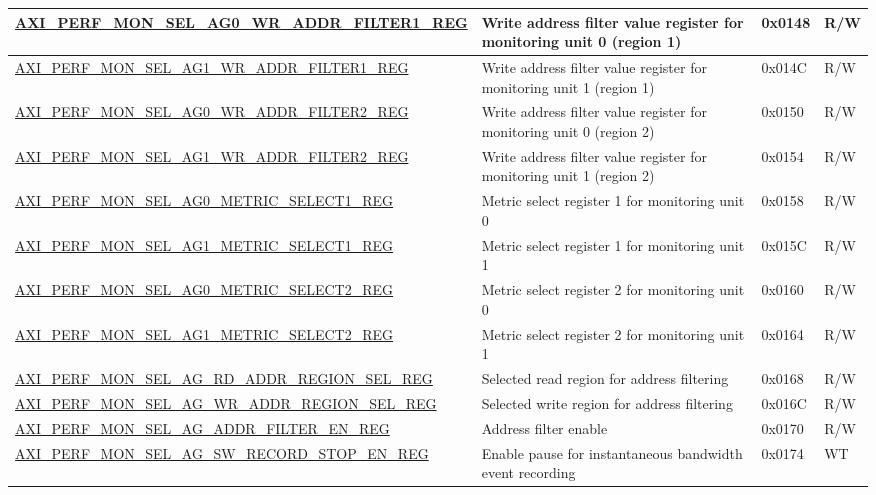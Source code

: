 \begin{longtable}{ | p{9.1cm} | p{5cm} | p{1.3cm} | p{1.4cm} | }
\hyperref[regdesc:AXIPERFMONSELAGNWRADDRFILTERMREG]{AXI\_PERF\_MON\_SEL\_AG0\_WR\_ADDR\_FILTER1\_REG} & Write address filter value register for monitoring unit 0 (region 1) & 0x0148 & R/W\\ \hline
\hyperref[regdesc:AXIPERFMONSELAGNWRADDRFILTERMREG]{AXI\_PERF\_MON\_SEL\_AG1\_WR\_ADDR\_FILTER1\_REG} & Write address filter value register for monitoring unit 1 (region 1) & 0x014C & R/W\\ \hline
\hyperref[regdesc:AXIPERFMONSELAGNWRADDRFILTERMREG]{AXI\_PERF\_MON\_SEL\_AG0\_WR\_ADDR\_FILTER2\_REG} & Write address filter value register for monitoring unit 0 (region 2) & 0x0150 & R/W\\ \hline
\hyperref[regdesc:AXIPERFMONSELAGNWRADDRFILTERMREG]{AXI\_PERF\_MON\_SEL\_AG1\_WR\_ADDR\_FILTER2\_REG} & Write address filter value register for monitoring unit 1 (region 2) & 0x0154 & R/W\\ \hline
\hyperref[regdesc:AXIPERFMONSELAGNMETRICSELECTMREG]{AXI\_PERF\_MON\_SEL\_AG0\_METRIC\_SELECT1\_REG} & Metric select register 1 for monitoring unit 0 & 0x0158 & R/W\\ \hline
\hyperref[regdesc:AXIPERFMONSELAGNMETRICSELECTMREG]{AXI\_PERF\_MON\_SEL\_AG1\_METRIC\_SELECT1\_REG} & Metric select register 1 for monitoring unit 1 & 0x015C & R/W\\ \hline
\hyperref[regdesc:AXIPERFMONSELAGNMETRICSELECTMREG]{AXI\_PERF\_MON\_SEL\_AG0\_METRIC\_SELECT2\_REG} & Metric select register 2 for monitoring unit 0 & 0x0160 & R/W\\ \hline
\hyperref[regdesc:AXIPERFMONSELAGNMETRICSELECTMREG]{AXI\_PERF\_MON\_SEL\_AG1\_METRIC\_SELECT2\_REG} & Metric select register 2 for monitoring unit 1 & 0x0164 & R/W\\ \hline
\hyperref[regdesc:AXIPERFMONSELAGRDADDRREGIONSELREG]{AXI\_PERF\_MON\_SEL\_AG\_RD\_ADDR\_REGION\_SEL\_REG} & Selected read region for address filtering & 0x0168 & R/W\\ \hline
\hyperref[regdesc:AXIPERFMONSELAGWRADDRREGIONSELREG]{AXI\_PERF\_MON\_SEL\_AG\_WR\_ADDR\_REGION\_SEL\_REG} & Selected write region for address filtering & 0x016C & R/W\\ \hline
\hyperref[regdesc:AXIPERFMONSELAGADDRFILTERENREG]{AXI\_PERF\_MON\_SEL\_AG\_ADDR\_FILTER\_EN\_REG} & Address filter enable & 0x0170 & R/W\\ \hline
\hyperref[regdesc:AXIPERFMONSELAGSWRECORDSTOPENREG]{AXI\_PERF\_MON\_SEL\_AG\_SW\_RECORD\_STOP\_EN\_REG} & Enable pause for instantaneous bandwidth event recording & 0x0174 & WT\\ \hline

\end{longtable}
